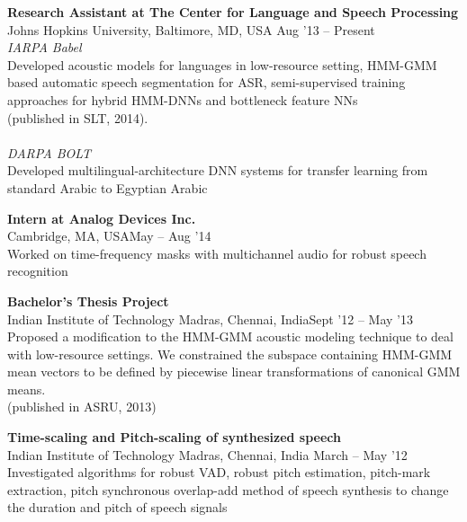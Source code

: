 \documentclass[margin,line,pifont,palatino,courier]{res}
\begin{document}
\begin{resume}
\textbf{Research Assistant at The Center for Language and Speech Processing} \\
Johns Hopkins University, Baltimore, MD, USA \hfill Aug '13 -- Present \vspace{2pt} \\
\textit{IARPA Babel} \\
Developed acoustic models for languages in low-resource setting, HMM-GMM based automatic
speech segmentation for ASR, semi-supervised training
approaches for hybrid HMM-DNNs and bottleneck feature NNs \\ 
(published in SLT, 2014). \\
\\
\textit{DARPA BOLT}\\
Developed multilingual-architecture DNN systems for transfer learning from standard Arabic to Egyptian Arabic\\
\vspace{-5pt}

\textbf{Intern at Analog Devices Inc.} \\
Cambridge, MA, USA\hfill May -- Aug '14 \vspace{2pt} \\
Worked on time-frequency masks with multichannel audio for robust speech recognition
\vspace{-5pt}

\textbf{Bachelor's Thesis Project} \\
Indian Institute of Technology Madras, Chennai, India\hfill Sept '12 -- May '13 \vspace{2pt}  \\
Proposed a modification to the HMM-GMM acoustic modeling technique to deal with low-resource settings. We constrained the subspace containing HMM-GMM mean vectors to be defined by piecewise linear transformations of canonical GMM means. \\
(published in ASRU, 2013)\\
\vspace{-5pt}

\textbf{Time-scaling and Pitch-scaling of synthesized speech} \\
Indian Institute of Technology Madras, Chennai, India \hfill March -- May '12 \vspace{2pt} \\
Investigated algorithms for robust VAD, robust pitch estimation, pitch-mark extraction, pitch synchronous overlap-add method of speech synthesis to change the duration and pitch of speech signals
\vspace{-5pt}


\end{resume}
\end{document}

